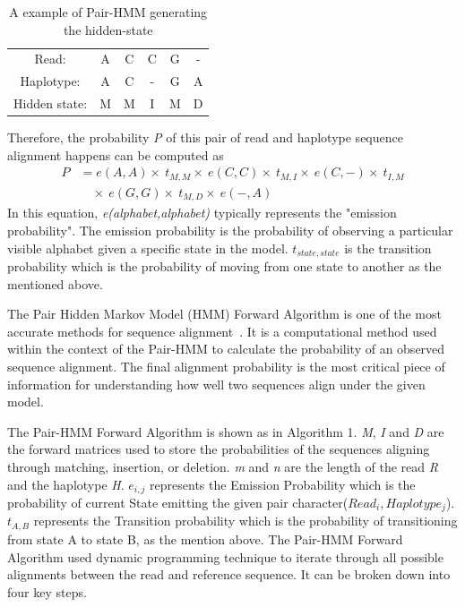 \documentclass[PhD]{PHlab-thesis}
\begin{document}
\begin{table}[h]
    \centering
    \begin{tabular}{cccccc}
    \multicolumn{1}{c}{Read:} & A & C & C & G & - \\
    \multicolumn{1}{c}{Haplotype:} & A & C & - & G & A \\
    \multicolumn{1}{c}{Hidden state:} & M & M & I & M & D \\
    \end{tabular}
    \caption{A example of Pair-HMM generating the hidden-state}
    \label{tab:hidden state}
\end{table}
Therefore, the probability \textit{P} of this pair of read and haplotype sequence alignment happens can be computed as 
\begin{align*}
P &= e(A,A) \times\ t_{M,M} \times\ e(C,C) \times\ t_{M,I} \times\ e(C,-) \times\ t_{I,M} \\
  &\quad\times\ e(G,G) \times\ t_{M,D} \times\ e(-,A)
\end{align*}
In this equation, \textit{e(alphabet,alphabet)} typically represents the "emission probability". The emission probability is the probability of observing a particular visible alphabet given a specific state in the model. \textit{$t_{state,state}$} is the transition probability which is the probability of moving from one state to another as the mentioned above.

The Pair Hidden Markov Model (HMM) Forward Algorithm is one of the most accurate methods for sequence alignment~\cite{Shanshan1,EnliangLi1}. It is a computational method used within the context of the Pair-HMM to calculate the probability of an observed sequence alignment. The final alignment probability is the most critical piece of information for understanding how well two sequences align under the given model.

The Pair-HMM Forward Algorithm is shown as in Algorithm 1. \textit{M}, \textit{I} and \textit{D} are the forward matrices used to store the probabilities of the sequences aligning through matching, insertion, or deletion. \textit{m} and \textit{n} are the length of the read \textit{R} and the haplotype \textit{H}. $e_{i,j}$ represents the Emission Probability which is the probability of current State emitting the given pair character($Read_{i},Haplotype_{j}$).  $t_{A,B}$ represents the Transition probability which is the probability of transitioning from state A to state B, as the mention above.
The Pair-HMM Forward Algorithm used dynamic programming technique to iterate through all possible alignments between the read and reference sequence. It can be broken down into four key steps.
\end{document}
